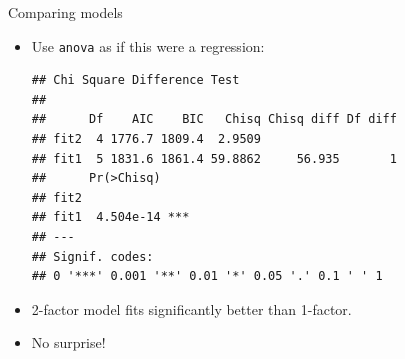 \begin{frame}[fragile]{Comparing models}
  
  \begin{itemize}
  \item Use \texttt{anova} as if this were a regression:
{\small    

\begin{knitrout}
\color{fgcolor}\begin{kframe}
\begin{alltt}
\end{alltt}
\begin{verbatim}
## Chi Square Difference Test
## 
##      Df    AIC    BIC   Chisq Chisq diff Df diff
## fit2  4 1776.7 1809.4  2.9509                   
## fit1  5 1831.6 1861.4 59.8862     56.935       1
##      Pr(>Chisq)    
## fit2               
## fit1  4.504e-14 ***
## ---
## Signif. codes:  
## 0 '***' 0.001 '**' 0.01 '*' 0.05 '.' 0.1 ' ' 1
\end{verbatim}
\end{kframe}
\end{knitrout}
}

\item 2-factor model fits significantly better than 1-factor.
\item No surprise!

    
  \end{itemize}
  
\end{frame}

